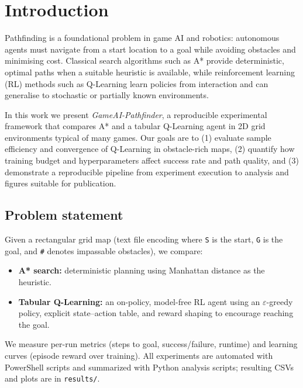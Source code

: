 \section{Introduction}
Pathfinding is a foundational problem in game AI and robotics: autonomous agents must navigate from a start location to a goal while avoiding obstacles and minimising cost. Classical search algorithms such as A* provide deterministic, optimal paths when a suitable heuristic is available, while reinforcement learning (RL) methods such as Q-Learning learn policies from interaction and can generalise to stochastic or partially known environments.

In this work we present \emph{GameAI-Pathfinder}, a reproducible experimental framework that compares A* and a tabular Q-Learning agent in 2D grid environments typical of many games. Our goals are to (1) evaluate sample efficiency and convergence of Q-Learning in obstacle-rich maps, (2) quantify how training budget and hyperparameters affect success rate and path quality, and (3) demonstrate a reproducible pipeline from experiment execution to analysis and figures suitable for publication.

\subsection{Problem statement}
Given a rectangular grid map (text file encoding where \texttt{S} is the start, \texttt{G} is the goal, and \texttt{\#} denotes impassable obstacles), we compare:
\begin{itemize}
  \item \textbf{A* search:} deterministic planning using Manhattan distance as the heuristic.
  \item \textbf{Tabular Q-Learning:} an on-policy, model-free RL agent using an $\varepsilon$-greedy policy, explicit state–action table, and reward shaping to encourage reaching the goal.
\end{itemize}

We measure per-run metrics (steps to goal, success/failure, runtime) and learning curves (episode reward over training). All experiments are automated with PowerShell scripts and summarized with Python analysis scripts; resulting CSVs and plots are in \texttt{results/}.

